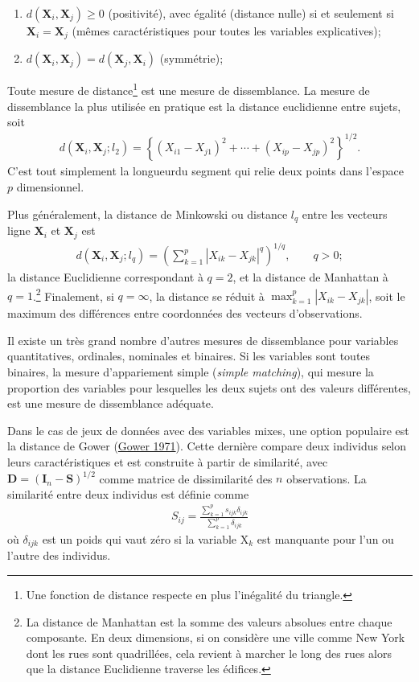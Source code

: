 \documentclass[
  11pt,
  letterpaper,
]{scrbook}
\providecommand{\tightlist}{%
  \setlength{\itemsep}{0pt}\setlength{\parskip}{0pt}}\usepackage{longtable,booktabs,array}
\theoremstyle{definition}
\theoremstyle{remark}
\begin{document}
\begin{enumerate}
\def\labelenumi{\arabic{enumi})}
\tightlist
\item
  \(d(\mathbf{X}_i, \mathbf{X}_j) \geq 0\) (positivité), avec égalité
  (distance nulle) si et seulement si \(\mathbf{X}_i=\mathbf{X}_j\)
  (mêmes caractéristiques pour toutes les variables explicatives);
\item
  \(d(\mathbf{X}_i, \mathbf{X}_j)=d(\mathbf{X}_j, \mathbf{X}_i)\)
  (symmétrie);
\end{enumerate}

Toute mesure de distance\footnote{Une fonction de distance respecte en
  plus l'inégalité du triangle.} est une mesure de dissemblance. La
mesure de dissemblance la plus utilisée en pratique est la distance
euclidienne entre sujets, soit \begin{align*}
d(\mathbf{X}_i, \mathbf{X}_j; l_2) = \left\{(X_{i1}-X_{j1})^2 + \cdots + (X_{ip}-X_{jp})^2\right\}^{1/2}.
\end{align*} C'est tout simplement la longueurdu segment qui relie deux
points dans l'espace \(p\) dimensionnel.

Plus généralement, la distance de Minkowski ou distance \(l_q\) entre
les vecteurs ligne \(\mathbf{X}_i\) et \(\mathbf{X}_j\) est
\begin{align*}
d(\mathbf{X}_i, \mathbf{X}_j; l_q) = \left( \sum_{k=1}^p |X_{ik}-X_{jk}|^q \right)^{1/q},\qquad q > 0;
\end{align*} la distance Euclidienne correspondant à \(q=2\), et la
distance de Manhattan à \(q=1\).\footnote{La distance de Manhattan est
  la somme des valeurs absolues entre chaque composante. En deux
  dimensions, si on considère une ville comme New York dont les rues
  sont quadrillées, cela revient à marcher le long des rues alors que la
  distance Euclidienne traverse les édifices.} Finalement, si
\(q=\infty\), la distance se réduit à \(\max_{k=1}^p |X_{ik}-X_{jk}|\),
soit le maximum des différences entre coordonnées des vecteurs
d'observations.

Il existe un très grand nombre d'autres mesures de dissemblance pour
variables quantitatives, ordinales, nominales et binaires. Si les
variables sont toutes binaires, la mesure d'appariement simple
(\emph{simple matching}), qui mesure la proportion des variables pour
lesquelles les deux sujets ont des valeurs différentes, est une mesure
de dissemblance adéquate.

Dans le cas de jeux de données avec des variables mixes, une option
populaire est la distance de Gower
(\protect\hyperlink{ref-Gower:1971}{Gower 1971}). Cette dernière compare
deux individus selon leurs caractéristiques et est construite à partir
de similarité, avec \(\mathbf{D} = (\mathbf{I}_n-\mathbf{S})^{1/2}\)
comme matrice de dissimilarité des \(n\) observations. La similarité
entre deux individus est définie comme \begin{align*}
S_{ij} = \frac{\sum_{k=1}^p s_{ijk} \delta_{ijk}}{\sum_{k=1}^p \delta_{ijk}}
\end{align*} où \(\delta_{ijk}\) est un poids qui vaut zéro si la
variable \(\mathrm{X}_k\) est manquante pour l'un ou l'autre des
individus.
\end{document}
